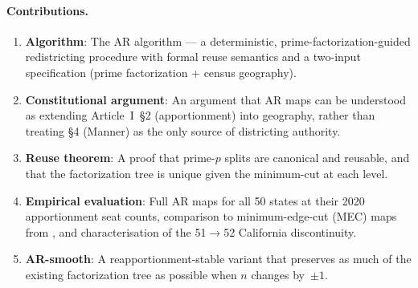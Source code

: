 \paragraph{Contributions.}
\begin{enumerate}
  \item \textbf{Algorithm}: The AR algorithm --- a deterministic,
        prime-factorization-guided redistricting procedure with formal
        reuse semantics and a two-input specification (prime factorization
        + census geography).
  \item \textbf{Constitutional argument}: An argument that AR maps can be
        understood as extending Article~I~\S2 (apportionment) into geography,
        rather than treating \S4 (Manner) as the only source of districting
        authority.
  \item \textbf{Reuse theorem}: A proof that prime-$p$ splits are
        canonical and reusable, and that the factorization tree is unique
        given the minimum-cut at each level.
  \item \textbf{Empirical evaluation}: Full AR maps for all 50 states at
        their 2020 apportionment seat counts, comparison to minimum-edge-cut
        (MEC) maps from \citet{dellaLibera2026mec}, and characterisation of
        the 51$\to$52 California discontinuity.
  \item \textbf{AR-smooth}: A reapportionment-stable variant that preserves
        as much of the existing factorization tree as possible when $n$
        changes by~$\pm 1$.
\end{enumerate}
